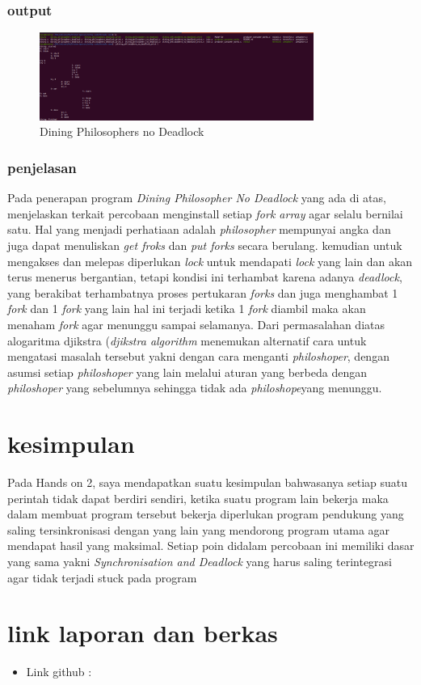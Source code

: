 \documentclass[11pt,a4paper]{article}
\begin{document}
\subsubsection*{output}
\begin{figure}[h]
	\centering
	\includegraphics[width=0.8\textwidth]{Figure/testing/Percobaan-Nodeadlock.png}
	\caption{Dining Philosophers no Deadlock}
\end{figure}

\newpage
\vspace{3cm}
\subsubsection{penjelasan}
Pada penerapan program \textit{Dining Philosopher No Deadlock} yang ada di atas, menjelaskan terkait percobaan menginstall setiap \textit{fork array} agar selalu bernilai satu. Hal yang menjadi perhatiaan adalah \textit{philosopher} mempunyai angka dan juga dapat menuliskan \textit{get froks} dan \textit{put forks} secara berulang. kemudian untuk mengakses dan melepas diperlukan \textit{lock} untuk mendapati \textit{lock} yang lain dan akan terus menerus bergantian, tetapi kondisi ini terhambat karena adanya \textit{deadlock}, yang berakibat terhambatnya proses pertukaran \textit{forks} dan juga menghambat 1 \textit{fork} dan 1 \textit{fork} yang lain hal ini terjadi ketika 1 \textit{fork} diambil maka akan menaham \textit{fork} agar menunggu sampai selamanya. Dari permasalahan diatas alogaritma djikstra (\textit{djikstra algorithm} menemukan alternatif cara untuk mengatasi masalah tersebut yakni dengan cara menganti \textit{philoshoper}, dengan asumsi setiap \textit{philoshoper} yang lain melalui aturan yang berbeda dengan \textit{philoshoper} yang sebelumnya sehingga tidak ada \textit{philoshope}yang menunggu. 
\newpage

\section{kesimpulan}
Pada Hands on 2, saya mendapatkan suatu kesimpulan bahwasanya setiap suatu perintah tidak dapat berdiri sendiri, ketika suatu program lain bekerja  maka dalam membuat program tersebut bekerja diperlukan program pendukung yang saling tersinkronisasi dengan yang lain yang mendorong program utama agar mendapat hasil yang maksimal. Setiap poin didalam percobaan ini memiliki dasar yang sama yakni \textit{Synchronisation and Deadlock} yang harus saling terintegrasi agar tidak terjadi stuck pada program
\section{link laporan dan berkas}
\begin{itemize}
	\item Link github :\href{}{}
\end{itemize}
\end{document}
